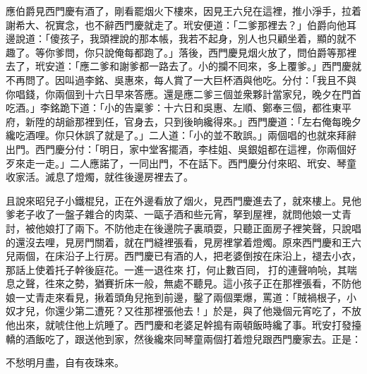 應伯爵見西門慶有酒了，剛看罷烟火下樓來，因見王六兒在這裡，推小淨手，拉着謝希大、祝實念，也不辭西門慶就走了。玳安便道：「二爹那裡去？」伯爵向他耳邊說道：「傻孩子，我頭裡說的那本帳，我若不起身，別人也只顧坐着，顯的就不趣了。等你爹問，你只說俺每都跑了。」落後，西門慶見烟火放了，問伯爵等那裡去了，玳安道：「應二爹和謝爹都一路去了。小的攔不囘來，多上覆爹。」西門慶就不再問了。因叫過李銘、吳惠來，每人賞了一大巨杯酒與他吃。分付：「我且不與你唱錢，你兩個到十六日早來答應。還是應二爹三個並衆夥計當家兒，晚夕在門首吃酒。」李銘跪下道：「小的告稟爹：十六日和吳惠、左順、鄭奉三個，都徃東平府，新陞的胡爺那裡到任，官身去，只到後晌纔得來。」西門慶道：「左右俺每晚夕纔吃酒哩。你只休誤了就是了。」二人道：「小的並不敢誤。」兩個唱的也就來拜辭出門。西門慶分付：「明日，家中堂客擺酒，李桂姐、吳銀姐都在這裡，你兩個好歹來走一走。」二人應諾了，一同出門，不在話下。西門慶分付來昭、玳安、琴童收家活。滅息了燈燭，就徃後邊房裡去了。

且說來昭兒子小鐵棍兒，正在外邊看放了烟火，見西門慶進去了，就來樓上。見他爹老子收了一盤子雜合的肉菜、一甌子酒和些元宵，拏到屋裡，就問他娘一丈青討，被他娘打了兩下。不防他走在後邊院子裏頑耍，只聽正面房子裡笑聲，只說唱的還沒去哩，見房門關着，就在門縫裡張看，見房裡掌着燈燭。原來西門慶和王六兒兩個，在床沿子上行房。西門慶已有酒的人，把老婆倒按在床沿上，褪去小衣，那話上使着托子幹後庭花。一進一退徃來𢵞打，何止數百囘，𢵞打的連聲响喨，其喘息之聲，徃來之勢，猶賽折床一般，無處不聽見。這小孩子正在那裡張看，不防他娘一丈青走來看見，揪着頭角兒拖到前邊，鑿了兩個栗爆，罵道：「賊禍根子，小奴才兒，你還少第二遭死？又徃那裡張他去！」於是，與了他幾個元宵吃了，不放他出來，就唬住他上炕睡了。西門慶和老婆足幹搗有兩頓飯時纔了事。玳安打發擡轎的酒飯吃了，跟送他到家，然後纔來同琴童兩個打着燈兒跟西門慶家去。正是：

\begin{myquote}
不愁明月盡，自有夜珠來。
\end{myquote}

